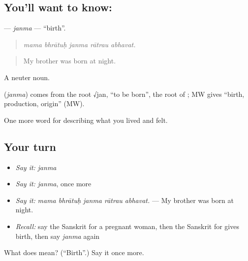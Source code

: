 \subsection*{You'll want to know: }
\textbf{} — \emph{janma} — \textquotedblleft{}birth\textquotedblright{}.

\begin{quote}
    
\end{quote}

\begin{quote}
\emph{mama bhrātuḥ janma rātrau abhavat.}
\end{quote}

\begin{quote}
My brother was born at night.
\end{quote}

A neuter noun.

\begin{cousinweb}
\textbf{} (\emph{janma}) comes from the root √jan, \textquotedblleft{}to be born\textquotedblright{}, the root of \textbf{}; MW gives \textquotedblleft{}birth, production, origin\textquotedblright{} (MW).
\end{cousinweb}

\begin{grammarlens}[title={What you've built}]
One more word for describing what you lived and felt.
\end{grammarlens}

\subsection*{Your turn}
\begin{itemize}
\raggedright
  \item \emph{Say it:} \emph{janma}
  \item \emph{Say it:} \emph{janma}, once more
  \item \emph{Say it:} \emph{mama bhrātuḥ janma rātrau abhavat.} — My brother was born at night.
  \item \emph{Recall:} say the Sanskrit for a pregnant woman, then the Sanskrit for gives birth, then say \emph{janma} again
\end{itemize}

\begin{tcolorbox}[breakable,colback=teal!4,colframe=teal!35!black,title={Before you move on}]
What does  mean? (\textquotedblleft{}Birth\textquotedblright{}.) Say it once more.
\end{tcolorbox}
